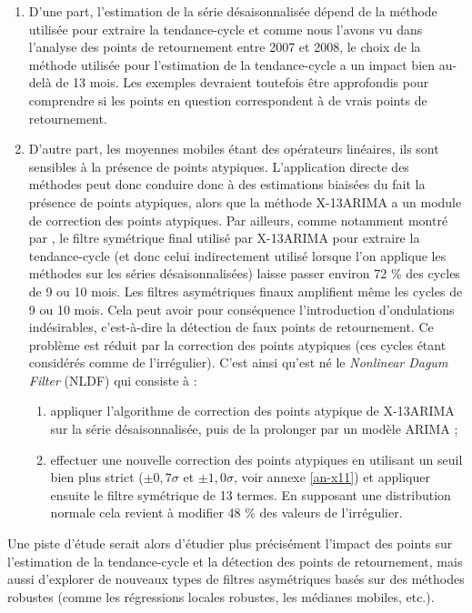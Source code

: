 \documentclass[
  11pt,
  french,
  a4paper]{article}
\newcommand\1{\mathds{1}}
\begin{document}
\begin{enumerate}
\def\labelenumi{\arabic{enumi}.}
\item
  D'une part, l'estimation de la série désaisonnalisée dépend de la méthode utilisée pour extraire la tendance-cycle et comme nous l'avons vu dans l'analyse des points de retournement entre 2007 et 2008, le choix de la méthode utilisée pour l'estimation de la tendance-cycle a un impact bien au-delà de 13 mois.
  Les exemples devraient toutefois être approfondis pour comprendre si les points en question correspondent à de vrais points de retournement.
\item
  D'autre part, les moyennes mobiles étant des opérateurs linéaires, ils sont sensibles à la présence de points atypiques.
  L'application directe des méthodes peut donc conduire donc à des estimations biaisées du fait la présence de points atypiques, alors que la méthode X-13ARIMA a un module de correction des points atypiques.
  Par ailleurs, comme notamment montré par \textcite{dagum1996new}, le filtre symétrique final utilisé par X-13ARIMA pour extraire la tendance-cycle (et donc celui indirectement utilisé lorsque l'on applique les méthodes sur les séries désaisonnalisées) laisse passer environ 72 \% des cycles de 9 ou 10 mois.
  Les filtres asymétriques finaux amplifient même les cycles de 9 ou 10 mois.
  Cela peut avoir pour conséquence l'introduction d'ondulations indésirables, c'est-à-dire la détection de faux points de retournement.
  Ce problème est réduit par la correction des points atypiques (ces cycles étant considérés comme de l'irrégulier).
  C'est ainsi qu'est né le \emph{Nonlinear Dagum Filter} (NLDF) qui consiste à :

  \begin{enumerate}
  \def\labelenumii{\alph{enumii}.}
  \item
    appliquer l'algorithme de correction des points atypique de X-13ARIMA sur la série désaisonnalisée, puis de la prolonger par un modèle ARIMA ;
  \item
    effectuer une nouvelle correction des points atypiques en utilisant un seuil bien plus strict (\(\pm0,7\sigma\) et \(\pm 1,0 \sigma\), voir annexe \ref{an-x11}) et appliquer ensuite le filtre symétrique de 13 termes.
    En supposant une distribution normale cela revient à modifier 48 \% des valeurs de l'irrégulier.
  \end{enumerate}
\end{enumerate}

Une piste d'étude serait alors d'étudier plus précisément l'impact des points sur l'estimation de la tendance-cycle et la détection des points de retournement, mais aussi d'explorer de nouveaux types de filtres asymétriques basés sur des méthodes robustes (comme les régressions locales robustes, les médianes mobiles, etc.).
\end{document}
